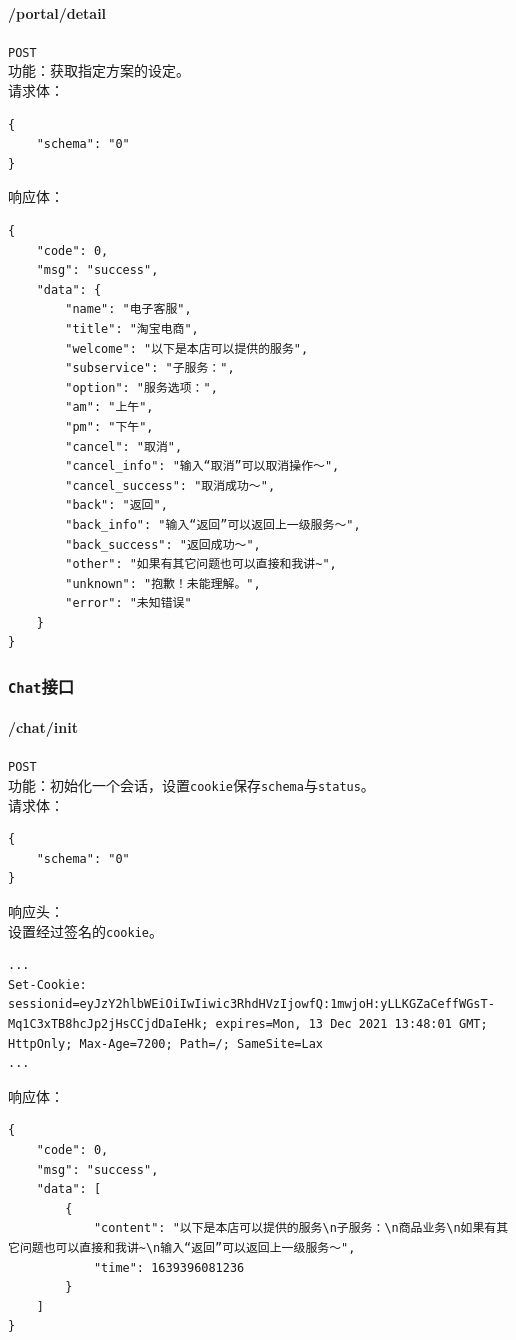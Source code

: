 \documentclass[hyperref]{ctexart}
\begin{document}
\paragraph{/portal/detail} \texttt{POST}\\
功能：获取指定方案的设定。\\
请求体：
\begin{lstlisting}
{
    "schema": "0"
}
\end{lstlisting}
响应体：
\begin{lstlisting}
{
    "code": 0,
    "msg": "success",
    "data": {
        "name": "电子客服",
        "title": "淘宝电商",
        "welcome": "以下是本店可以提供的服务",
        "subservice": "子服务：",
        "option": "服务选项：",
        "am": "上午",
        "pm": "下午",
        "cancel": "取消",
        "cancel_info": "输入“取消”可以取消操作～",
        "cancel_success": "取消成功～",
        "back": "返回",
        "back_info": "输入“返回”可以返回上一级服务～",
        "back_success": "返回成功～",
        "other": "如果有其它问题也可以直接和我讲~",
        "unknown": "抱歉！未能理解。",
        "error": "未知错误"
    }
}
\end{lstlisting}
\subsubsection{\texttt{Chat}接口}
\paragraph{/chat/init} \texttt{POST}\\
功能：初始化一个会话，设置\texttt{cookie}保存\texttt{schema}与\texttt{status}。\\
请求体：
\begin{lstlisting}
{
    "schema": "0"
}
\end{lstlisting}
响应头：\\
设置经过签名的\texttt{cookie}。
\begin{lstlisting}
...
Set-Cookie: sessionid=eyJzY2hlbWEiOiIwIiwic3RhdHVzIjowfQ:1mwjoH:yLLKGZaCeffWGsT-Mq1C3xTB8hcJp2jHsCCjdDaIeHk; expires=Mon, 13 Dec 2021 13:48:01 GMT; HttpOnly; Max-Age=7200; Path=/; SameSite=Lax
...
\end{lstlisting}
响应体：
\begin{lstlisting}
{
    "code": 0,
    "msg": "success",
    "data": [
        {
            "content": "以下是本店可以提供的服务\n子服务：\n商品业务\n如果有其它问题也可以直接和我讲~\n输入“返回”可以返回上一级服务～",
            "time": 1639396081236
        }
    ]
}
\end{lstlisting}
\end{document}
